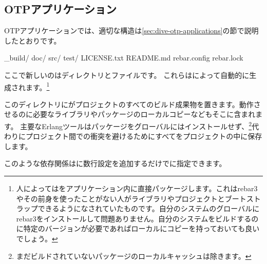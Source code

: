 \subsection{OTPアプリケーション}
\label{subsec:building-otp-applications}

OTPアプリケーションでは、適切な構造は\ref{sec:dive-otp-applications}の節で説明したとおりです。

\begin{VerbatimText}
_build/
doc/
src/
test/
LICENSE.txt
README.md
rebar.config
rebar.lock
\end{VerbatimText}

ここで新しいのはディレクトリとファイルです。
これらはによって自動的に生成されます。\footnote{人によってはをアプリケーション内に直接パッケージします。これはrebar3やその前身を使ったことがない人がライブラリやプロジェクトとブートストラップできるようになされていたものです。自分のシステムのグローバルにrebar3をインストールして問題ありません。自分のシステムをビルドするのに特定のバージョンが必要であればローカルにコピーを持っておいても良いでしょう。}

このディレクトリにがプロジェクトのすべてのビルド成果物を置きます。動作させるのに必要なライブラリやパッケージのローカルコピーなどもそこに含まれます。
主要なErlangツールはパッケージをグローバルにはインストールせず、\footnote{まだビルドされていないパッケージのローカルキャッシュは除きます。}代わりにプロジェクト間での衝突を避けるためにすべてをプロジェクトの中に保存します。

このような依存関係はに数行設定を追加するだけでに指定できます。

